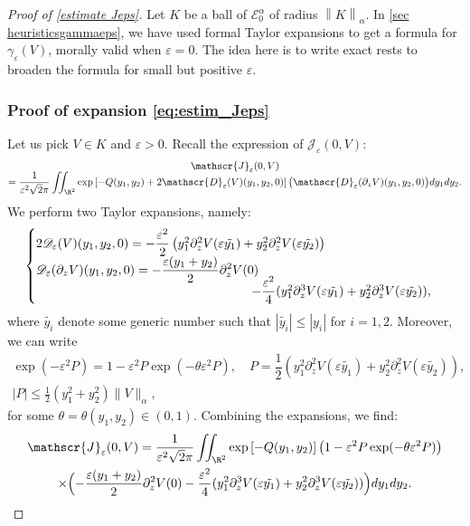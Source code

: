 \documentclass[10pt]{amsart}
\let\mathcal\mathscr
\theoremstyle{plain}
\theoremstyle{definition}
\newcommand{\D}{\mathcal{D}_\eps}
\newcommand{\Je}{\mathcal{J}_\eps}
\let\eps\varepsilon
\let\ds\displaystyle
\newcommand{\abs}[1]{\left\lvert#1\right\rvert}
\newcommand{\nalph}[1]{\left\lVert#1\right\rVert_\alpha}
\newcommand{\Eaz}{\mathcal{E}^\alpha_0}
\begin{document}
\begin{proof}[Proof of \cref{estimate Jeps}]
Let $K$ be a ball of $\Eaz$ of radius $\nalph{K}$. In \cref{sec heuristicsgammaeps}, we have used formal Taylor expansions to get a formula for $\gamma_\eps(V)$, morally valid when $\eps = 0$. The idea here is to write exact rests to broaden the formula for small but positive $\eps$.

\subsubsection*{Proof of expansion \eqref{eq:estim_Jeps}}
Let us pick $V\in K$ and $\eps>0$. Recall the expression of $\Je(0,V)$:
\begin{multline*}
\Je(0,V)\\[-5pt]
= \dfrac{1}{\eps^2 \sqrt{2}\pi } \ds \iint_{\R^2} \exp \left[-Q(y_1,y_2) + 2 \D(V)(y_1,y_2,0) \right] \big(\D(\partial_z V)(y_1,y_2,0) \big) d y_1 d y_2.
\end{multline*}
We perform two Taylor expansions, namely:
\begin{equation}\label{eq:Taylor1}
\begin{cases}
2 \D(V)(y_1,y_2,0) = - \dfrac{\eps^2}{2}\left(y_1^2 \partial_z^2 V(\eps \tilde{y_1}) + y_2^2 \partial_z^2 V(\eps \tilde{y_2}) \right)\\
\ds \D(\partial_z V)(y_1,y_2,0) = - \dfrac{\eps (y_1+y_2)}{2} \partial_z^2 V(0)\\[-5pt]
\hspace*{6cm}- \dfrac{\eps^2}{4} (y_1^2 \partial_z^3 V(\eps \tilde{y_1}) + y_2^2 \partial_z^3 V(\eps \tilde{y_2})),
\end{cases}
\end{equation}
where $\tilde{y_i}$ denote some generic number such that $\abs{\tilde{y_i}} \leq \abs{y_i}$ for $i=1,2$.
Moreover, we can write
\begin{equation}\label{eq:P}
\begin{gathered}
\exp(-\eps^2 P) = 1 -\eps^2 P \exp(-\theta\eps^2 P), \quad P = \dfrac{1}{2}\left(y_1^2 \partial_z^2 V(\eps \tilde{y_1}) + y_2^2 \partial_z^2 V(\eps \tilde{y_2}) \right),\\ |P|\leq \frac12 \left (y_1^2 + y_2^2\right) \|V\|_\alpha,
\end{gathered}
\end{equation}
for some $\theta = \theta(y_1,y_2)\in (0,1)$. Combining the expansions, we find:
\begin{multline*}
\Je(0,V) = \dfrac{1}{\eps^2 \sqrt{2}\pi} \ds \iint_{\R^2} \exp \left[-Q(y_1,y_2)\right ] \left (1 -\eps^2 P \exp(-\theta\eps^2 P) \right) \\ \times\Bigl (- \dfrac{\eps (y_1+y_2)}{2} \partial_z^2 V(0)- \dfrac{\eps^2}{4} (y_1^2 \partial_z^3 V(\eps \tilde{y_1}) + y_2^2 \partial_z^3 V(\eps \tilde{y_2})) \Bigr) d y_1 d y_2.

\end{multline*}
\end{proof}
\end{document}

